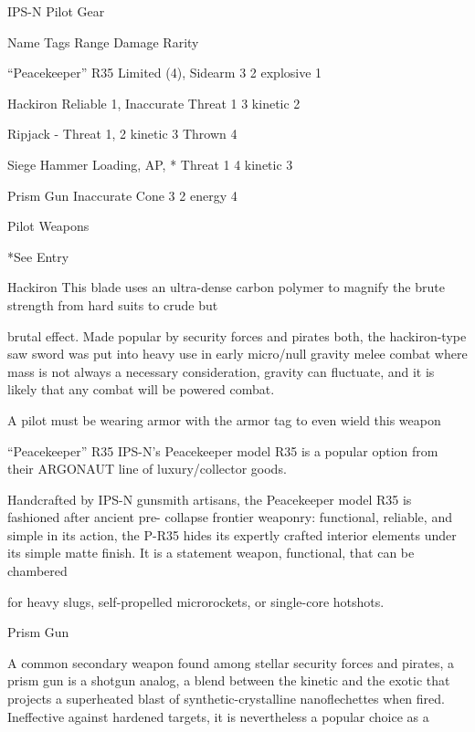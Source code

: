                                                 IPS-N Pilot Gear  

  Name                     Tags                                      Range            Damage                   Rarity 

  “Peacekeeper” R35        Limited (4), Sidearm                      3                2 explosive              1 

 Hackiron                  Reliable 1, Inaccurate                   Threat 1          3 kinetic                2 

 Ripjack                   -                                        Threat 1,         2 kinetic                3 
                                                                    Thrown 4 

 Siege Hammer              Loading, AP, *                           Threat 1          4 kinetic                3 

 Prism Gun                 Inaccurate                                Cone 3           2 energy                 4 

                                                     Pilot Weapons  

*See Entry
 

Hackiron  
This blade uses an ultra-dense carbon polymer to magnify the brute strength from hard suits to crude but  

brutal effect. Made popular by security forces and pirates both, the hackiron-type saw sword was put into  
heavy use in early micro/null gravity melee combat where mass is not always a necessary consideration,  
gravity can fluctuate, and it is likely that any combat will be powered combat.  

A pilot must be wearing armor with the armor tag to even wield this weapon  

“Peacekeeper” R35  
IPS-N’s Peacekeeper model R35 is a popular option from their ARGONAUT line of luxury/collector goods.  

Handcrafted by IPS-N gunsmith artisans, the Peacekeeper model R35 is fashioned after ancient pre- 
collapse frontier weaponry: functional, reliable, and simple in its action, the P-R35 hides its expertly crafted  
interior elements under its simple matte finish. It is a statement weapon, functional, that can be chambered  

for heavy slugs, self-propelled microrockets, or single-core hotshots.  

Prism Gun  

A common secondary weapon found among stellar security forces and pirates, a prism gun is a shotgun  
analog, a blend between the kinetic and the exotic that projects a superheated blast of synthetic-crystalline  
nanoflechettes when fired. Ineffective against hardened targets, it is nevertheless a popular choice as a  

